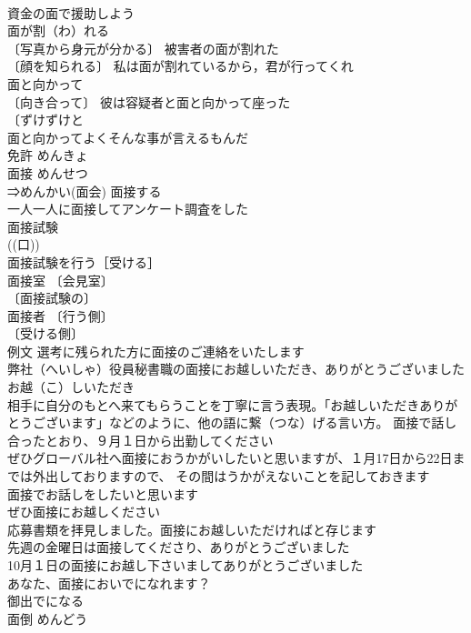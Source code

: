 \documentclass[8pt]{extreport}
\begin{document}
\begin{CJK}{UTF8}{min}
\\	資金の面で援助しよう 
\\	面が割（わ）れる 
\\	〔写真から身元が分かる〕 被害者の面が割れた 
\\	〔顔を知られる〕 私は面が割れているから，君が行ってくれ 
\\	面と向かって 
\\	〔向き合って〕 彼は容疑者と面と向かって座った 
\\	〔ずけずけと
\\	面と向かってよくそんな事が言えるもんだ 
\\	免許	めんきょ	
\\	面接	めんせつ	
\\	⇒めんかい(面会) 面接する 
\\	一人一人に面接してアンケート調査をした 
\\	面接試験 
\\	((口)) 
\\	面接試験を行う［受ける］ 
\\	面接室 〔会見室〕
\\	〔面接試験の〕
\\	面接者 〔行う側〕
\\	〔受ける側〕
\\	例文 選考に残られた方に面接のご連絡をいたします 
\\	弊社（へいしゃ）役員秘書職の面接にお越しいただき、ありがとうございました
\\	お越（こ）しいただき　
\\	相手に自分のもとへ来てもらうことを丁寧に言う表現。「お越しいただきありがとうございます」などのように、他の語に繋（つな）げる言い方。 面接で話し合ったとおり、９月１日から出勤してください 
\\	ぜひグローバル社へ面接におうかがいしたいと思いますが、１月17日から22日までは外出しておりますので、 その間はうかがえないことを記しておきます 
\\	面接でお話しをしたいと思います 
\\	ぜひ面接にお越しください 
\\	応募書類を拝見しました。面接にお越しいただければと存じます 
\\	先週の金曜日は面接してくださり、ありがとうございました 
\\	10月１日の面接にお越し下さいましてありがとうございました 
\\	あなた、面接においでになれます？ 
\\	御出でになる　
\\	面倒	めんどう	

\end{CJK}
\end{document}
